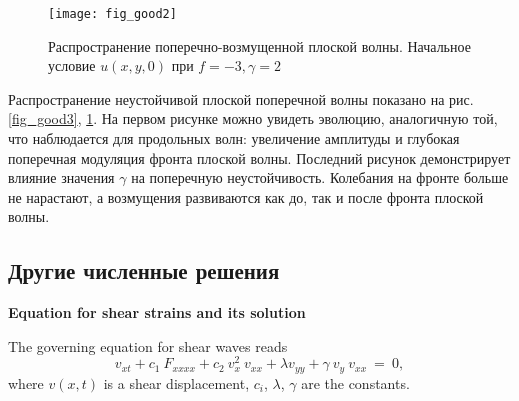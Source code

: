 \begin{figure}
	\centering
	\texttt{[image: fig\_good2]}
	\caption{Распространение поперечно-возмущенной плоской волны. Начальное условие $u(x,y,0)$ при $f = -3, \gamma = 2$} \label{fig_good2}
\end{figure}

Распространение неустойчивой плоской поперечной волны показано на рис. ~ \ref {fig_good3}, \ref{fig_good2}. На первом рисунке можно увидеть эволюцию, аналогичную той, что наблюдается для продольных волн: увеличение амплитуды и глубокая поперечная модуляция фронта плоской волны. Последний рисунок демонстрирует влияние значения $ \gamma $ на поперечную неустойчивость. Колебания на фронте больше не нарастают, а возмущения развиваются как до, так и после фронта плоской волны.



\subsection{Другие численные решения}
\textbf{Equation for shear strains and its solution}


The governing equation for shear waves reads \cite{PorKrOs, poosan20}
\begin{equation}
	v_{xt} +c_1~F_{xxxx}+ c_2~ v_{x}^2~ v_{xx}+\lambda v_{yy}+\gamma~v_{y}~ v_{xx}~=~0, \label{kpsh}
\end{equation}
where $v(x,t)$ is a shear displacement, $c_i$, $\lambda$, $\gamma$ are the constants. 

